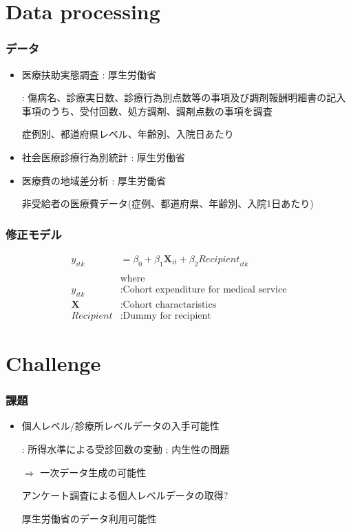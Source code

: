 \documentclass[dvipdfmx,14pt]{beamer}
\begin{document}
\section{Data processing}
\begin{frame}\frametitle{データ}

 \begin{itemize}
 
 \item 医療扶助実態調査 : 厚生労働省
 
  : 傷病名、診療実日数、診療行為別点数等の事項及び調剤報酬明細書の記入事項のうち、受付回数、処方調剤、調剤点数の事項を調査
  
  症例別、都道府県レベル、年齢別、入院日あたり
  
\item 社会医療診療行為別統計 : 厚生労働省

\item 医療費の地域差分析 : 厚生労働省

非受給者の医療費データ(症例、都道府県、年齢別、入院1日あたり)
 
 \end{itemize}

\end{frame}

\begin{frame}\frametitle{修正モデル}

\begin{align*}
  y_{itk} &= \beta_0 + \beta_1 \mathbf{X}_{it} + \beta_2 \textit{Recipient}_{itk} \\
    \\
    & \text{where} \\
   y_{itk} &: \text{Cohort expenditure for medical service} \\
  \mathbf{X} &: \text{Cohort charactaristics} \\
  \textit{Recipient} &: \text{Dummy for recipient}
  \end{align*}

\end{frame}

\section{Challenge}
\begin{frame}\frametitle{課題}

 \begin{itemize}
 
 \item 個人レベル/診療所レベルデータの入手可能性
 
 : 所得水準による受診回数の変動 ; 内生性の問題
 
 $\Rightarrow$ 一次データ生成の可能性
 
 アンケート調査による個人レベルデータの取得?
 
 厚生労働省のデータ利用可能性
 
 \end{itemize}

\end{frame}
\end{document}
